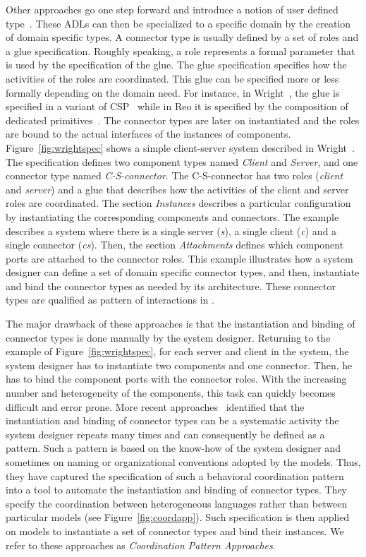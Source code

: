 Other approaches go one step forward and introduce a notion of user defined type~\cite{uniconbib,wrightbib,reobib}. These ADLs can then be specialized to a specific domain by the creation of domain specific types. A connector type is usually defined by a set of roles and a glue specification. Roughly speaking, a role represents a formal parameter that is used by the specification of the glue. The glue specification specifies how the activities of the roles are coordinated. This glue can be specified more or less formally depending on the domain need. For instance, in Wright~\cite{wrightbib}, the glue is specified in a variant of CSP~\cite{csphoarebib} while in Reo it is specified by the composition of dedicated primitives~\cite{reobib}. The connector types are later on instantiated and the roles are bound to the actual interfaces of the instances of components. Figure~\ref{fig:wrightspec} shows a simple client-server system described in Wright~\cite{wrightbib}. The specification defines two component types named \emph{Client} and \emph{Server}, and one connector type named \emph{C-S-connector}. The C-S-connector has two roles (\emph{client} and \emph{server}) and a glue that describes how the activities of the client and server roles are coordinated. The section \emph{Instances} describes a particular configuration by instantiating the corresponding components and connectors. The example describes a system where there is a single server (\emph{s}), a single client (\emph{c}) and a single connector (\emph{cs}). Then, the section \emph{Attachments} defines which component ports are attached to the connector roles. This example illustrates how a system designer can define a set of domain specific connector types, and then, instantiate and bind the connector types as needed by its architecture. These connector types are qualified as pattern of interactions in \cite{wrightbib}. 
			
The major drawback of these approaches is that the instantiation and binding of connector types is done manually by the system designer. Returning to the example of Figure~\ref{fig:wrightspec}, for each server and client in the system, the system designer has to instantiate two components and one connector. Then, he has to bind the component ports with the connector roles. With the increasing number and heterogeneity of the components, this task can quickly becomes difficult and error prone. More recent approaches~\cite{dinatale,mascotbib,ptoleframebib,modhelxbib} identified that the instantiation and binding of connector types can be a systematic activity the system designer repeats many times and can consequently be defined as a pattern. Such a pattern is based on the know-how of the system designer and sometimes on naming or organizational conventions adopted by the models. Thus, they have captured the specification of such a behavioral coordination pattern into a tool to automate the instantiation and binding of connector types. They specify the coordination between heterogeneous languages rather than between particular models (see Figure~\ref{fig:coordapp}). Such specification is then applied on models to instantiate a set of connector types and bind their instances. We refer to these approaches as \emph{Coordination Pattern Approaches}.
         
